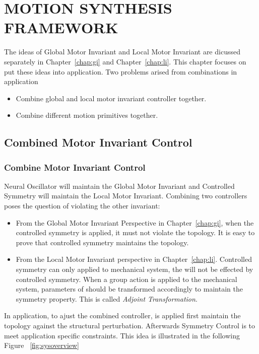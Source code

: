 \chapter {MOTION SYNTHESIS FRAMEWORK}
\label{chap:msf}
\graphicspath{{CombineFramework/CombineFrameworkFigs/EPS/}{CombineFramework/CombineFrameworkFigs/}}

The ideas of Global Motor Invariant and Local Motor Invariant are dicussed separately in Chapter~\ref{chap:gi} and Chapter~\ref{chap:li}.
This chapter focuses on put these ideas into \cms application.
Two problems arised from combinations in application
\begin{itemize}
	\item Combine global and local motor invariant controller together.
	\item Combine different motion primitives together.
\end{itemize}

\section{Combined Motor Invariant Control}

\subsection{ Combine Motor Invariant Control}

Neural Oscillator will maintain the Global Motor Invariant and Controlled Symmetry will maintain the Local Motor Invariant.
Combining two controllers poses the question of violating the other invariant:
\begin{itemize}
\item From the Global Motor Invariant Perspective in Chapter~\ref{chap:gi},
when the controlled symmetry  is applied, it must not violate the topology. 
It is easy to prove that controlled symmetry maintains the topology.

\item From the Local Motor Invariant perspective in Chapter~\ref{chap:li}.
Controlled symmetry can only applied to mechanical system, the \cpg will not be effected by controlled symmetry.
When a group action is applied to the mechanical system, parameters of \cpg should be transformed accordingly to maintain the symmetry property.
This is called \emph{Adjoint Transformation}.
\end{itemize}


In application, to ajust the combined controller,
\cpg is applied first maintain the topology against the structural perturbation. 
Afterwards Symmetry Control is to meet application specific constraints.
This idea is illustrated in the following Figure ~\ref{fig:sysoverview}

